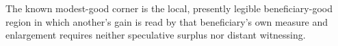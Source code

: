 \begin{definition}\PaperGradeGap{-2pt}
  The known modest-good corner is the local, presently legible beneficiary-good region in
  which another's gain is read by that beneficiary's own measure and enlargement requires
  neither speculative surplus nor distant witnessing.
\end{definition}
